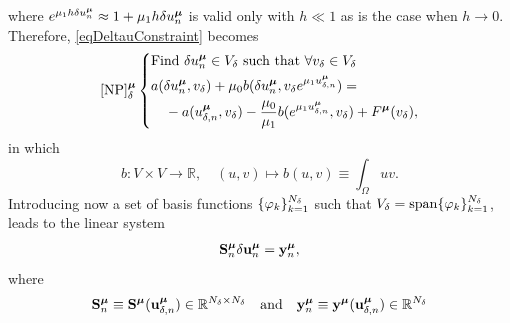 \documentclass[
    conference,
    nofonttune,
    11pt
]{IEEEtran}
\begin{document}
            where $e^{\mu_1h\delta u^{\boldsymbol\mu}_n}\approx1+\mu_1h\delta u^{\boldsymbol\mu}_n$ is valid only with $h\ll1$ as is the case when $h\rightarrow0$. Therefore, \eqref{eqDeltauConstraint} becomes
            \begin{equation}
                \refstepcounter{equation}
                \label{eqIterativeVarNLEllipticPED}
                \text{\NewtonNLEllPDE}
                \left\{\begin{aligned}
                    &\text{Find $\delta u^\boldmu_n\in V_\delta$
                    such that $\forall v_\delta\in V_\delta$}\\
                    &\begin{aligned}
                        &a(\delta u^\boldmu_n,v_\delta)
                        +\mu_0b(\delta u^\boldmu_n,
                        v_\delta e^{\mu_1u^\boldmu_{\delta,n}})
                        =\\&\quad-a(u^\boldmu_{\delta,n},v_\delta)
                        -\frac{\mu_0}{\mu_1}
                        b(e^{\mu_1u^\boldmu_{\delta,n}},v_\delta)
                        +F^\boldmu(v_\delta),
                    \end{aligned}
                \end{aligned}\right.
                \notag
            \end{equation}
            in which
            \begin{equation*}
                b:V\times V\to\mathbb R,\quad
                (u,v)\mapsto b(u,v)
                \equiv\int_\Omega u v.
            \end{equation*}
            Introducing now a set of basis functions $\{\varphi_k\}_{k=1}^{N_\delta}$ such that $V_\delta=\operatorname{span}\{\varphi_k\}_{k=1}^{N_\delta}$, leads to the linear system
            \begin{equation}
                \label{eqGalerIterLS}
                \mathbf S^\boldmu_n\delta\mathbf u^\boldmu_n
                =\mathbf y^\boldmu_n,
            \end{equation}
            where
            $$
                \mathbf S^{\boldsymbol\mu}_n
                \equiv\mathbf S^{\boldsymbol\mu}(\mathbf u^{\boldsymbol\mu}_{\delta,n})
                \in\mathbb R^{{N_\delta}\times{N_\delta}}
                \quad\text{and}\quad
                \mathbf y^{\boldsymbol\mu}_n
                \equiv\mathbf y^{\boldsymbol\mu}(\mathbf u^{\boldsymbol\mu}_{\delta,n})
                \in\mathbb R^{N_\delta}
            $$
\end{document}
